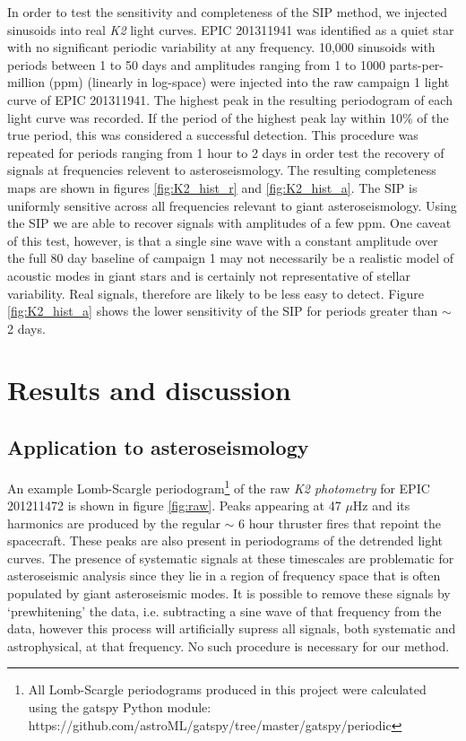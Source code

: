 \documentclass[useAMS, usenatbib]{aastex}
\begin{document}
In order to test the sensitivity and completeness of the SIP method,
we injected sinusoids into real {\it K2} light curves.
EPIC 201311941 was identified as a quiet star with no significant periodic
variability at any frequency.
10,000 sinusoids with periods between 1 to 50 days and amplitudes ranging from
1 to 1000 parts-per-million (ppm) (linearly in log-space) were injected into
the raw campaign 1 light curve of EPIC 201311941.
The highest peak in the resulting periodogram of each light curve was recorded.
If the period of the highest peak lay within 10\% of the true period, this was
considered a successful detection.
This procedure was repeated for periods ranging from 1 hour to 2 days in order
test the recovery of signals at frequencies relevent to asteroseismology.
The resulting completeness maps are shown in figures \ref{fig:K2_hist_r} and
\ref{fig:K2_hist_a}.
The SIP is uniformly sensitive across all frequencies relevant to giant
asteroseismology.
Using the SIP we are able to recover signals with amplitudes of a few ppm.
One caveat of this test, however, is that a single sine wave with a constant
amplitude over the full 80 day baseline of campaign 1 may not necessarily be
a realistic model of acoustic modes in giant stars and is certainly not
representative of stellar variability.
Real signals, therefore are likely to be less easy to detect.
Figure \ref{fig:K2_hist_a} shows the lower sensitivity of the SIP for periods
greater than $\sim$ 2 days.

\section{Results and discussion}
\subsection{Application to asteroseismology}

An example Lomb-Scargle periodogram\footnote{All Lomb-Scargle periodograms
produced in this project were calculated using the gatspy Python module:
https://github.com/astroML/gatspy/tree/master/gatspy/periodic}
of the raw {\it K2 photometry} for EPIC 201211472 is shown in figure
\ref{fig:raw}.
Peaks appearing at 47 $\mu$Hz and its harmonics are produced by the regular
$\sim$ 6 hour thruster fires that repoint the spacecraft.
These peaks are also present in periodograms of the \citet{Vanderburg2014}
detrended light curves.
The presence of systematic signals at these timescales are problematic for
asteroseismic analysis since they lie in a region of frequency space
that is often populated by giant asteroseismic modes.
It is possible to remove these signals by `prewhitening' the data, i.e.
subtracting a sine wave of that frequency from the data, however this process
will artificially supress all signals, both systematic and astrophysical, at
that frequency.
No such procedure is necessary for our method.
\end{document}
